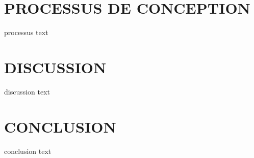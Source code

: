 \documentclass[letterpaper,twoside,12pt,french]{report}
\begin{document}
\chapter*{\uppercase{Processus de conception}}
processus text
\chapter*{\uppercase{Discussion}}
discussion text
\chapter*{\uppercase{Conclusion}}
conclusion text
\end{document}
